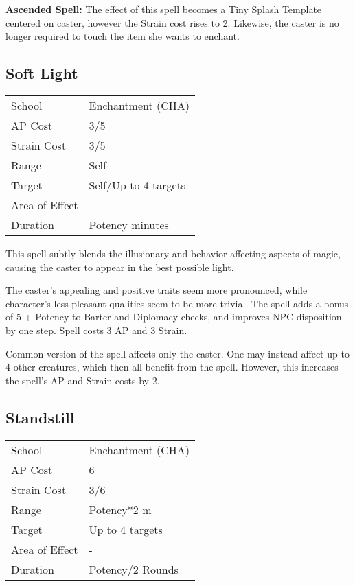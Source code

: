 \documentclass[11pt,a4paper,twocolumn]{book}
\begin{document}
\bigskip

\textbf{Ascended Spell:} The effect of this spell becomes a Tiny Splash Template centered on caster, however the Strain cost rises to 2. Likewise, the caster is no longer required to touch the item she wants to enchant.


\subsection*{Soft Light}
{
	\begin{tabu} to 75mm{| X[l,4] | X[l,7] |}
		\hline
		School 			& Enchantment (CHA) 	\\
		AP Cost	      	& 3/5 					\\
		Strain Cost     & 3/5 					\\
		Range     		& Self					\\
		Target      	& Self/Up to 4 targets	\\
		Area of Effect  & -	 					\\
		Duration     	& Potency minutes		\\ \hline
	\end{tabu}
	
}

\medskip

This spell subtly blends the illusionary and behavior-affecting aspects of magic, causing the caster to appear in the best possible light.

The caster's appealing and positive traits seem more pronounced, while character's less pleasant qualities seem to be more trivial. The spell adds a bonus of 5 + Potency to Barter and Diplomacy checks, and improves NPC disposition by one step. Spell costs 3 AP and 3 Strain.

Common version of the spell affects only the caster. One may instead affect up to 4 other creatures, which then all benefit from the spell. However, this increases the spell's AP and Strain costs by 2.

\vfill

\subsection*{Standstill}
{
	\begin{tabu} to 75mm{| X[l,4] | X[l,7] |}
		\hline
		School 			& Enchantment (CHA) 		\\
		AP Cost	      	& 6 					\\
		Strain Cost     & 3/6 					\\
		Range     		& Potency*2 m			\\
		Target      	& Up to 4 targets		\\
		Area of Effect  & - 	 				\\
		Duration     	& Potency/2 Rounds		\\ \hline
	\end{tabu}
	
}
\end{document}
